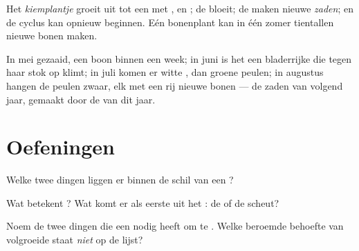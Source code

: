 \begin{proposition}\label{prop:g2:from-seed-to-plant:cycle}
Het \emph{kiemplantje} groeit uit tot een  met
,  en ; de  bloeit; de  maken nieuwe
\emph{zaden}; en de cyclus kan opnieuw beginnen. Eén bonenplant kan in
één zomer tientallen nieuwe bonen maken.
\end{proposition}
\admitted

\begin{example}\label{ex:g2:from-seed-to-plant:summer}
In mei gezaaid,  een boon binnen een week; in juni is het een
bladerrijke  die tegen haar stok op klimt; in juli komen er witte
, dan groene peulen; in augustus hangen de peulen zwaar, elk met
een rij nieuwe bonen --- de zaden van volgend jaar, gemaakt door de
 van dit jaar.
\end{example}

\section{Oefeningen}

\begin{exercise}[$\star$]\label{exo:g2:from-seed-to-plant:1}
Welke twee dingen liggen er binnen de schil van een ?
\end{exercise}

\begin{exercise}[$\star$]\label{exo:g2:from-seed-to-plant:2}
Wat betekent \emph{}? Wat komt er als eerste uit het : de
 of de scheut?
\end{exercise}

\begin{exercise}[$\star$]\label{exo:g2:from-seed-to-plant:3}
Noem de twee dingen die een  nodig heeft om te . Welke
beroemde behoefte van volgroeide  staat \emph{niet} op de lijst?
\end{exercise}


